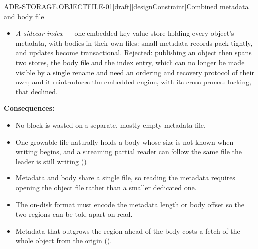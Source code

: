 \begin{requirement}{ADR-STORAGE.OBJECTFILE-01}[draft][designConstraint]{Combined metadata and body file}
\begin{itemize}
      growing update simply rewrites the tail. Rejected: every update
      changes the file's length while readers may be streaming the body's
      final bytes and validating the length they were promised, and every
      lookup must locate the trailer through a fixed footer before it can
      read anything; a header-first record confines updates to a
      fixed-position region instead.
    \item \emph{A sidecar index} --- one embedded key-value store holding
      every object's metadata, with bodies in their own files: small
      metadata records pack tightly, and updates become transactional.
      Rejected: publishing an object then spans two stores, the body file
      and the index entry, which can no longer be made visible by a single
      rename and need an ordering and recovery protocol of their own; and it
      reintroduces the embedded engine, with its cross-process locking,
      that  declined.
  \end{itemize}

  \textbf{Consequences:}
  \begin{itemize}
    \item[+] No block is wasted on a separate, mostly-empty metadata file.
    \item[+] One growable file naturally holds a body whose size is not
      known when writing begins, and a streaming partial reader can follow
      the same file the leader is still writing
      ().
    \item[--] Metadata and body share a single file, so reading the metadata
      requires opening the object file rather than a smaller dedicated one.
    \item[--] The on-disk format must encode the metadata length or body offset
      so the two regions can be told apart on read.
    \item[--] Metadata that outgrows the region ahead of the body costs a
      fetch of the whole object from the origin
      ().
  \end{itemize}



\end{requirement}

